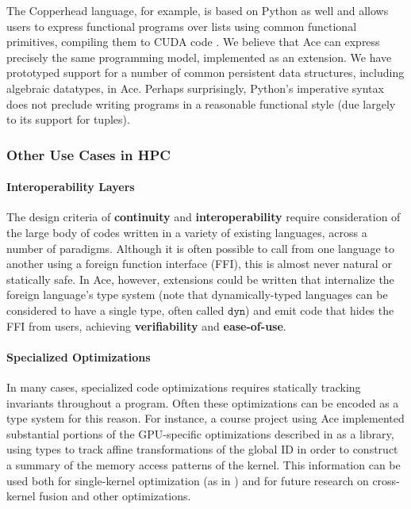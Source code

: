 \documentclass[9pt,preprint]{sigplanconf}
\begin{document}
The Copperhead language, for example, is based on Python as well and allows users to express functional programs over lists using common functional primitives, compiling them to CUDA code \cite{catanzaro2011copperhead}. We believe that Ace can express precisely the same programming model, implemented as an extension. We have prototyped support for a number of common persistent data structures, including algebraic datatypes, in Ace. Perhaps surprisingly, Python's imperative syntax does not preclude writing programs in a reasonable functional style (due largely to its support for tuples).

\subsubsection{Other Use Cases in HPC}
\paragraph{Interoperability Layers}
The design criteria of \textbf{continuity} and \textbf{interoperability} require consideration of the large body of codes written in a variety of existing languages, across a number of paradigms. Although it is often possible to call from one language to another using a foreign function interface (FFI), this is almost never natural or statically safe. In Ace, however, extensions could be written that internalize the foreign language's type system (note that dynamically-typed languages can be considered to have a single type, often called $\mathtt{dyn}$) and emit code that hides the FFI from users, achieving \textbf{verifiability} and \textbf{ease-of-use}.

\paragraph{Specialized Optimizations}
In many cases, specialized code optimizations requires statically tracking invariants throughout a program. Often these optimizations can be encoded as a type system for this reason. For instance, a course project using Ace  implemented substantial portions of the GPU-specific optimizations described in \cite{yang2010gpgpu} as a library, using types to track affine transformations of the global ID in order to construct a summary of the memory access patterns of the kernel. This information can be used both for single-kernel optimization (as in \cite{yang2010gpgpu}) and for future research on cross-kernel fusion and other optimizations.
\end{document}
